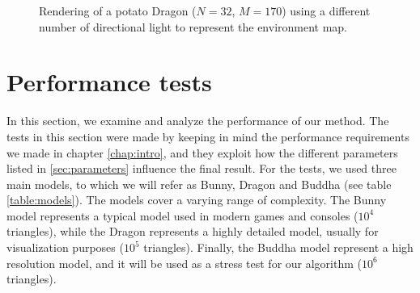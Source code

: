 \begin{figure}[!h]
\caption{Rendering of a potato Dragon ($N = 32$, $M = 170$) using a different number of directional light to represent the environment map.}
\label{fig:Dragonenv}
\end{figure}

\clearpage
\section{Performance tests}
\label{sec:perf}
In this section, we examine and analyze the performance of our method. The tests in this section were made by keeping in mind the performance requirements we made in chapter \ref{chap:intro}, and they exploit how the different parameters listed in \ref{sec:parameters} influence the final result. For the tests, we used three main models, to which we will refer as Bunny, Dragon and Buddha (see table \ref{table:models}). The models cover a varying range of complexity. The Bunny model represents a typical model used in modern games and consoles ($10^4$ triangles), while the Dragon represents a highly detailed model, usually for visualization purposes ($10^5$ triangles). Finally, the Buddha model represent a high resolution model, and it will be used as a stress test for our algorithm ($10^6$ triangles).

